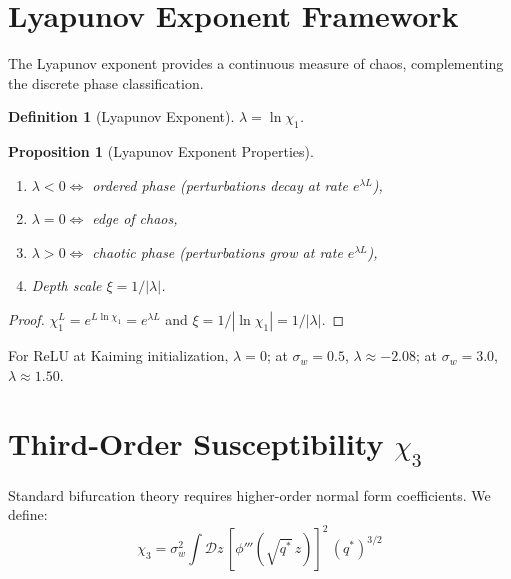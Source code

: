 \documentclass[10pt]{article}
\newtheorem{proposition}[theorem]{Proposition}
\newtheorem{definition}[theorem]{Definition}
\begin{document}
\section{Lyapunov Exponent Framework}
\label{app:lyapunov}

The Lyapunov exponent provides a continuous measure of chaos, complementing the discrete phase classification.

\begin{definition}[Lyapunov Exponent]
\label{def:lyapunov}
$\lambda = \ln \chi_1$.
\end{definition}

\begin{proposition}[Lyapunov Exponent Properties]
\label{prop:lyapunov}
\begin{enumerate}[nosep]
    \item $\lambda < 0 \Leftrightarrow$ ordered phase (perturbations decay at rate $e^{\lambda L}$),
    \item $\lambda = 0 \Leftrightarrow$ edge of chaos,
    \item $\lambda > 0 \Leftrightarrow$ chaotic phase (perturbations grow at rate $e^{\lambda L}$),
    \item Depth scale $\xi = 1/|\lambda|$.
\end{enumerate}
\end{proposition}

\begin{proof}
$\chi_1^L = e^{L \ln \chi_1} = e^{\lambda L}$ and $\xi = 1/|\ln \chi_1| = 1/|\lambda|$.
\end{proof}

For ReLU at Kaiming initialization, $\lambda = 0$; at $\sigma_w = 0.5$, $\lambda \approx -2.08$; at $\sigma_w = 3.0$, $\lambda \approx 1.50$.
\section{Third-Order Susceptibility $\chi_3$}
\label{app:chi3}

Standard bifurcation theory requires higher-order normal form coefficients.
We define:
\begin{equation}
    \chi_3 = \sigma_w^2 \int \mathcal{D}z\, [\phi'''(\sqrt{q^*}\, z)]^2\, (q^*)^{3/2}
\end{equation}
\end{document}
